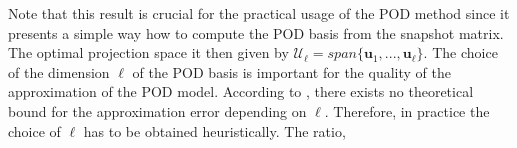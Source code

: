 %
%
Note that this result is crucial for the practical usage of the POD method since it presents a simple way how to compute the POD basis from the snapshot matrix. The optimal projection space it then given by $\mathcal{U}_\ell = span \{\mathbf{u}_1,...,\mathbf{u}_\ell\}$. The choice of the dimension $\ell$ of the POD basis is important for the quality of the approximation of the POD model. According to \cite{V11}, there exists no theoretical bound for the approximation error depending on $\ell$. Therefore, in practice the choice of $\ell$ has to be obtained heuristically. The ratio,

